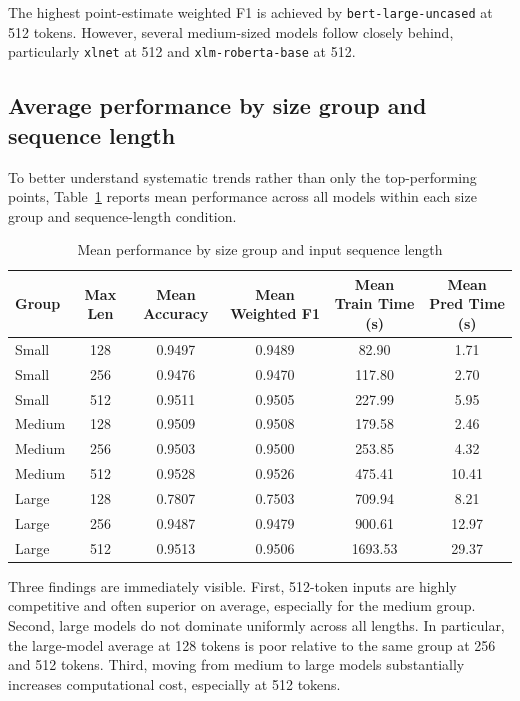 \documentclass[11pt]{article}
\begin{document}
The highest point-estimate weighted F1 is achieved by \texttt{bert-large-uncased} at 512 tokens. However, several medium-sized models follow closely behind, particularly \texttt{xlnet} at 512 and \texttt{xlm-roberta-base} at 512.

\subsection{Average performance by size group and sequence length}

To better understand systematic trends rather than only the top-performing points, Table~\ref{tab:group-averages} reports mean performance across all models within each size group and sequence-length condition.

\begin{table}[H]
\centering
\caption{Mean performance by size group and input sequence length}
\label{tab:group-averages}
\begin{tabular}{lccccc}
\toprule
Group & Max Len & Mean Accuracy & Mean Weighted F1 & Mean Train Time (s) & Mean Pred Time (s) \\
\midrule
Small & 128 & 0.9497 & 0.9489 & 82.90 & 1.71 \\
Small & 256 & 0.9476 & 0.9470 & 117.80 & 2.70 \\
Small & 512 & 0.9511 & 0.9505 & 227.99 & 5.95 \\
\midrule
Medium & 128 & 0.9509 & 0.9508 & 179.58 & 2.46 \\
Medium & 256 & 0.9503 & 0.9500 & 253.85 & 4.32 \\
Medium & 512 & 0.9528 & 0.9526 & 475.41 & 10.41 \\
\midrule
Large & 128 & 0.7807 & 0.7503 & 709.94 & 8.21 \\
Large & 256 & 0.9487 & 0.9479 & 900.61 & 12.97 \\
Large & 512 & 0.9513 & 0.9506 & 1693.53 & 29.37 \\
\bottomrule
\end{tabular}
\end{table}

Three findings are immediately visible. First, 512-token inputs are highly competitive and often superior on average, especially for the medium group. Second, large models do not dominate uniformly across all lengths. In particular, the large-model average at 128 tokens is poor relative to the same group at 256 and 512 tokens. Third, moving from medium to large models substantially increases computational cost, especially at 512 tokens.
\end{document}
